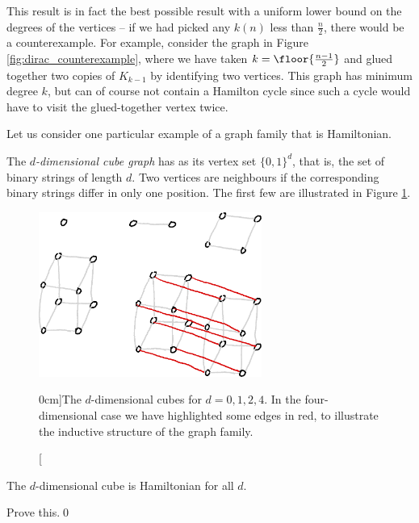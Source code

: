 \documentclass[nobib]{tufte-handout}
\begin{document}
\begin{remark}
    This result is in fact the best possible result with a uniform lower bound on the degrees of the vertices -- if we had picked any $k(n)$ less than $\frac{n}{2}$, there would be a counterexample. For example, consider the graph in Figure \ref{fig:dirac_counterexample}, where we have taken $k = \floor{\frac{n-1}{2}}$ and glued together two copies of $K_{k-1}$ by identifying two vertices. This graph has minimum degree $k$, but can of course not contain a Hamilton cycle since such a cycle would have to visit the glued-together vertex twice.
\end{remark}

Let us consider one particular example of a graph family that is Hamiltonian.

\begin{definition}
    The \emph{$d$-dimensional cube graph} has as its vertex set $\{0,1\}^d$, that is, the set of binary strings of length $d$. Two vertices are neighbours if the corresponding binary strings differ in only one position. The first few are illustrated in Figure \ref{fig:hypercubes}. 
\end{definition}

\begin{figure}
    \centering
    \includegraphics[width=0.65\textwidth]{graphics/L8_vx_covers_hamiltonicity_etc/binary_hypercubes.png}
    \caption[][0cm]{The $d$-dimensional cubes for $d = 0,1,2,4$. In the four-dimensional case we have highlighted some edges in red, to illustrate the inductive structure of the graph family.}
    \label{fig:hypercubes}
\end{figure}

\begin{theorem}\label{thm:hypercube_is_hamiltonian}
    The $d$-dimensional cube is Hamiltonian for all $d$.

    \begin{xca}
        Prove this.\qed
    \end{xca}
\end{theorem}
\end{document}
